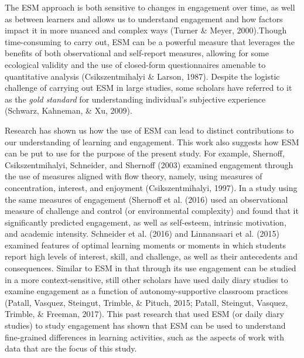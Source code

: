 \documentclass[]{msu-thesis}
\theoremstyle{definition}
\theoremstyle{definition}
\theoremstyle{definition}
\theoremstyle{remark}
\begin{document}
The ESM approach is both sensitive to changes in engagement over time,
as well as between learners and allows us to understand engagement and
how factors impact it in more nuanced and complex ways (Turner \& Meyer,
2000).Though time-consuming to carry out, ESM can be a powerful measure
that leverages the benefits of both observational and self-report
measures, allowing for some ecological validity and the use of
closed-form questionnaires amenable to quantitative analysis
(Csikszentmihalyi \& Larson, 1987). Despite the logistic challenge of
carrying out ESM in large studies, some scholars have referred to it as
the \emph{gold standard} for understanding individual's subjective
experience (Schwarz, Kahneman, \& Xu, 2009).

Research has shown us how the use of ESM can lead to distinct
contributions to our understanding of learning and engagement. This work
also suggests how ESM can be put to use for the purpose of the present
study. For example, Shernoff, Csikszentmihalyi, Schneider, and Shernoff
(2003) examined engagement through the use of measures aligned with flow
theory, namely, using measures of concentration, interest, and enjoyment
(Csikszentmihalyi, 1997). In a study using the same measures of
engagement (Shernoff et al. (2016) used an observational measure of
challenge and control (or environmental complexity) and found that it
significantly predicted engagement, as well as self-esteem, intrinsic
motivation, and academic intensity. Schneider et al. (2016) and
Linnansaari et al. (2015) examined features of optimal learning moments
or moments in which students report high levels of interest, skill, and
challenge, as well as their antecedents and consequences. Similar to ESM
in that through its use engagement can be studied in a more
context-sensitive, still other scholars have used daily diary studies to
examine engagement as a function of autonomy-supportive classroom
practices (Patall, Vasquez, Steingut, Trimble, \& Pituch, 2015; Patall,
Steingut, Vasquez, Trimble, \& Freeman, 2017). This past research that
used ESM (or daily diary studies) to study engagement has shown that ESM
can be used to understand fine-grained differences in learning
activities, such as the aspects of work with data that are the focus of
this study.
\end{document}
